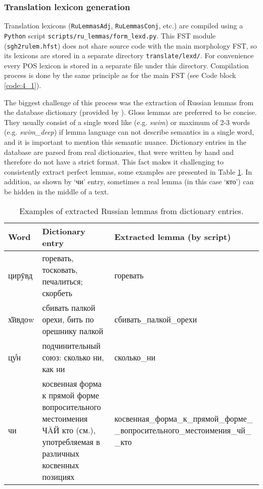 \FloatBarrier

\subsubsection*{Translation lexicon generation} \label{translation_lexicons}
Translation lexicons (\texttt{RuLemmasAdj}, \texttt{RuLemmasConj}, etc.) are compiled using a \texttt{Python} script \texttt{scripts/ru\_lemmas/form\_lexd.py}. This FST module (\texttt{sgh2rulem.hfst}) does not share source code with the main morphology FST, so its lexicons are stored in a separate directory \texttt{translate/lexd/}. For convenience every POS lexicon is stored in a separate file under this directory. Compilation process is done by the same principle as for the main FST (see Code block \ref{code:4_1}).

The biggest challenge of this process was the extraction of Russian lemmas from the database dictionary (provided by \textcite{makarov_digital_2022}). Gloss lemmas are preferred to be concise. They usually consist of a single word like (e.g. \textit{swim}) or maximum of 2-3 words (e.g. \textit{swim\_deep}) if lemma language can not describe semantics in a single word, and it is important to mention this semantic nuance. Dictionary entries in the database are parsed from real dictionaries, that were written by hand and therefore do not have a strict format. This fact makes it challenging to consistently extract perfect lemmas, some examples are presented in Table \ref{Tab:8_1}. In addition, as shown by `чи' entry, sometimes a real lemma (in this case `кто') can be hidden in the middle of a text. 

\begin{table}[!htbp]
    \begin{center}
        \begin{tabular}{|p{3cm}|p{5cm}|p{7cm}|}
            \hline
            \textbf{Word} & \textbf{Dictionary entry} & \textbf{Extracted lemma (by script)} \\
            \hline
            \hline
            цирӯвд & горевать, тосковать, печалиться; скорбеть & горевать \\
            \hline
            х̌ӣвдоw & сбивать палкой орехи, бить по орешнику палкой & сбивать\_палкой\_орехи \\
            \hline
            цу̊н & подчинительный союз: сколько ни, как ни & сколько\_ни \\
            \hline
            чи & косвенная форма к прямой форме вопросительного местоимения ЧĀЙ кто (см.), употребляемая в различных косвенных позициях & косвенная\_форма\_к\_прямой\_форме\_ \_вопросительного\_местоимения\_чй\_ \_кто \\
            \hline
        \end{tabular}
        \caption{Examples of extracted Russian lemmas from dictionary entries.}
        \label{Tab:8_1}
    \end{center}
\end{table}

